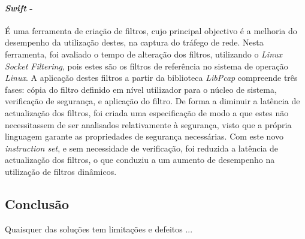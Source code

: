 \paragraph*{\textit{Swift} - }
É uma ferramenta de criação de filtros, cujo principal objectivo é a melhoria do desempenho da utilização destes, na captura do tráfego de rede.
Nesta ferramenta, foi avaliado o tempo de alteração dos filtros, utilizando o \textit{Linux Socket Filtering}, pois estes são os filtros de referência no sistema de operação \textit{Linux}.
A aplicação destes filtros a partir da biblioteca \textit{LibPcap} compreende três fases: cópia do filtro definido em nível utilizador para o núcleo de sistema, verificação de segurança, e aplicação do filtro.
De forma a diminuir a latência de actualização dos filtros, foi criada uma especificação de modo a que estes não necessitassem de ser analisados relativamente à segurança, visto que a própria linguagem garante as propriedades de segurança necessárias.
Com este novo \textit{instruction set}, e sem necessidade de verificação, foi reduzida a latência de actualização dos filtros, o que conduziu a um aumento de desempenho na utilização de filtros dinâmicos.


\subsection{Conclusão}

Quaisquer das soluções tem limitações e defeitos ...







